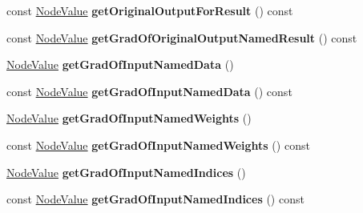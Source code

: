 \begin{DoxyCompactItemize}
const \hyperlink{structglow_1_1_node_value}{Node\+Value} {\bfseries get\+Original\+Output\+For\+Result} () const
\item 
\mbox{\label{classglow_1_1_sparse_lengths_weighted_sum_grad_node_ab92f813525977bdf3a64243c4f80fe72}} 
const \hyperlink{structglow_1_1_node_value}{Node\+Value} {\bfseries get\+Grad\+Of\+Original\+Output\+Named\+Result} () const
\item 
\mbox{\label{classglow_1_1_sparse_lengths_weighted_sum_grad_node_a0b471338f33c5d800fa853f663c67121}} 
\hyperlink{structglow_1_1_node_value}{Node\+Value} {\bfseries get\+Grad\+Of\+Input\+Named\+Data} ()
\item 
\mbox{\label{classglow_1_1_sparse_lengths_weighted_sum_grad_node_ab9f8e61091ef910f182aab06fd042809}} 
const \hyperlink{structglow_1_1_node_value}{Node\+Value} {\bfseries get\+Grad\+Of\+Input\+Named\+Data} () const
\item 
\mbox{\label{classglow_1_1_sparse_lengths_weighted_sum_grad_node_a54dc444b98c3cf6031d9813984cca1ff}} 
\hyperlink{structglow_1_1_node_value}{Node\+Value} {\bfseries get\+Grad\+Of\+Input\+Named\+Weights} ()
\item 
\mbox{\label{classglow_1_1_sparse_lengths_weighted_sum_grad_node_ae8e3303928f469dd0768902a47435400}} 
const \hyperlink{structglow_1_1_node_value}{Node\+Value} {\bfseries get\+Grad\+Of\+Input\+Named\+Weights} () const
\item 
\mbox{\label{classglow_1_1_sparse_lengths_weighted_sum_grad_node_aba76842ae035a216444b160f35aa1cee}} 
\hyperlink{structglow_1_1_node_value}{Node\+Value} {\bfseries get\+Grad\+Of\+Input\+Named\+Indices} ()
\item 
\mbox{\label{classglow_1_1_sparse_lengths_weighted_sum_grad_node_a91fa138ebe5750222e858ef37eb69904}} 
const \hyperlink{structglow_1_1_node_value}{Node\+Value} {\bfseries get\+Grad\+Of\+Input\+Named\+Indices} () const

\end{DoxyCompactItemize}
